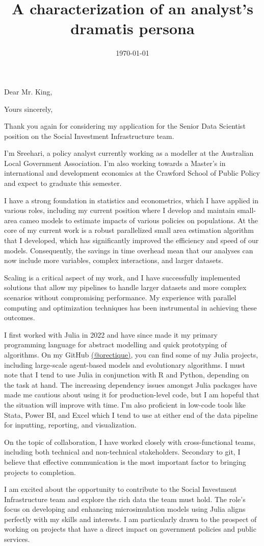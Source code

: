\documentclass[11pt,a4paper,sans]{moderncv}
\title{A characterization of an analyst's dramatis persona}                               \address{Canberra}{Australia}
\begin{document}
\date{\today}
\opening{Dear Mr. King,} %
\closing{Yours sincerely,}

\makelettertitle

Thank you again for considering my application for the Senior Data Scientist position on the Social Investment Infrastructure team. 

I'm Sreehari, a policy analyst currently working as a modeller at the Australian Local Government Association. I'm also working towards a Master's in international and development economics at the Crawford School of Public Policy and expect to graduate this semester. 

I have a strong foundation in statistics and econometrics, which I have applied in various roles, including my current position where I develop and maintain small-area cameo models to estimate impacts of various policies on populations. At the core of my current work is a robust parallelized small area estimation algorithm that I developed, which has significantly improved the efficiency and speed of our models. Consequently, the savings in time overhead mean that our analyses can now include more variables, complex interactions, and larger datasets. 

Scaling is a critical aspect of my work, and I have successfully implemented solutions that allow my pipelines to handle larger datasets and more complex scenarios without compromising performance. My experience with parallel computing and optimization techniques has been instrumental in achieving these outcomes.

I first worked with Julia in 2022 and have since made it my primary programming language for abstract modelling and quick prototyping of algorithms. On my GitHub \href{https://github.com/orectique}{(@orectique)}, you can find some of my Julia projects, including large-scale agent-based models and evolutionary algorithms. I must note that I tend to use Julia in conjunction with R and Python, depending on the task at hand. The increasing dependency issues amongst Julia packages have made me cautious about using it for production-level code, but I am hopeful that the situation will improve with time. I'm also proficient in low-code tools like Stata, Power BI, and Excel which I tend to use at either end of the data pipeline for inputting, reporting, and visualization.

On the topic of collaboration, I have worked closely with cross-functional teams, including both technical and non-technical stakeholders. Secondary to git, I believe that effective communication is the most important factor to bringing projects to completion. 

I am excited about the opportunity to contribute to the Social Investment Infrastructure team and explore the rich data the team must hold. The role's focus on developing and enhancing microsimulation models using Julia aligns perfectly with my skills and interests. I am particularly drawn to the prospect of working on projects that have a direct impact on government policies and public services.

\makeletterclosing
\end{document}
